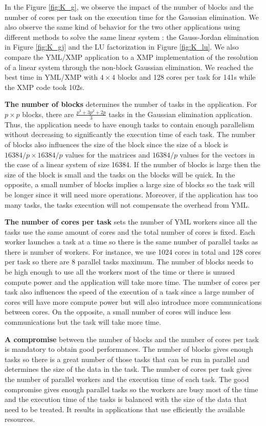 In the Figure \ref{fig:K_g}, we observe the impact of the number of blocks and the number of cores per task on the execution time for the Gaussian elimination.
We also observe the same kind of behavior for the two other applications using different methods to solve the same linear system : the Gauss-Jordan elimination in Figure \ref{fig:K_gj} and the LU factorization in Figure \ref{fig:K_lu}.
We also compare the YML/XMP application to a XMP implementation of the resolution of a linear system through the non-block Gaussian elimination.
We reached the best time in YML/XMP with $4 \times 4$ blocks and 128 cores per task for 141s while the XMP code took 102s.

\textbf{The number of blocks} determines the number of tasks in the application.
For $p \times p$ blocks, there are $\frac{p^3+3p^2+2p}{3}$ tasks in the Gaussian elimination application.
Thus, the application needs to have enough tasks to contain enough parallelism without decreasing to significantly the execution time of each task.
The number of blocks also influences the size of the block since the size of a block is $16384/p \times 16384/p$ values for the matrices and $16384/p$ values for the vectors in the case of a linear system of size 16384.
If the number of blocks is large then the size of the block is small and the tasks on the blocks will be quick.
In the opposite, a small number of blocks implies a large size of blocks so the task will be longer since it will need more operations.
Moreover, if the application has too many tasks, the tasks execution will not compensate the overhead from YML.

\textbf{The number of cores per task} sets the number of YML workers since all the tasks use the same amount of cores and the total number of cores is fixed.
Each worker launches a task at a time so there is the same number of parallel tasks as there is number of workers.
For instance, we use 1024 cores in total and 128 cores per task so there are 8 parallel tasks maximum.
The number of blocks needs to be high enough to use all the workers most of the time or there is unused compute power and the application will take more time.
The number of cores per task also influences the speed of the execution of a task since a large number of cores will have more compute power but will also introduce more communications between cores.
On the opposite, a small number of cores will induce less communications but the task will take more time.

\textbf{A compromise} between the number of blocks and the number of cores per task is mandatory to obtain good performances.
The number of blocks gives enough tasks so there is a great number of those tasks that can be run in parallel and determines the size of the data in the task.
The number of cores per task gives the number of parallel workers and the execution time of each task.
The good compromise gives enough parallel tasks so the workers are busy most of the time and the execution time of the tasks is balanced with the size of the data that need to be treated.
It results in applications that use efficiently the available resources.

